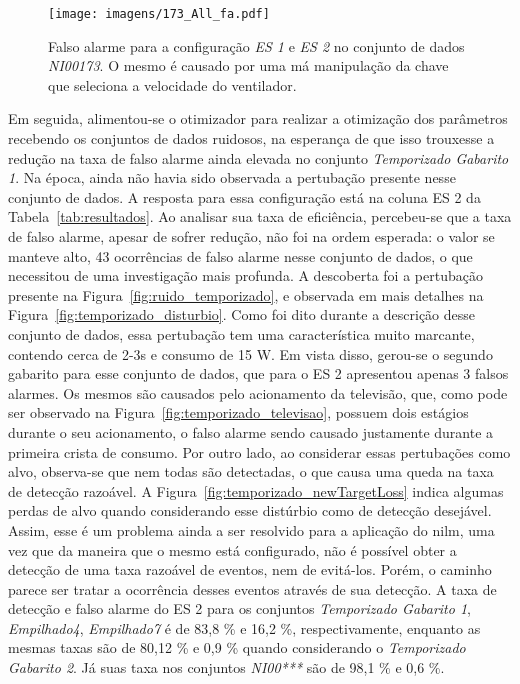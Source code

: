 \begin{sidewaysfigure}[p]
\centering
\texttt{[image: imagens/173\_All\_fa.pdf]}
\caption[Falso alarme para a configuração \emph{ES 1} e \emph{ES 2} no
conjunto de dados \emph{NI00173}.]{Falso alarme para a configuração
\emph{ES 1} e \emph{ES 2} no conjunto de dados \emph{NI00173}. O mesmo
é causado por uma má manipulação da chave que seleciona a
velocidade do ventilador.}
\label{fig:ni173_fa}
\end{sidewaysfigure}

Em seguida, alimentou-se o otimizador para realizar a otimização dos
parâmetros recebendo os conjuntos de dados ruidosos, na esperança de
que isso trouxesse a redução na taxa de falso alarme ainda elevada no
conjunto \emph{Temporizado Gabarito 1}. Na época, ainda não havia sido
observada a pertubação presente nesse conjunto de dados. A resposta
para essa configuração está na coluna ES 2 da
Tabela~\ref{tab:resultados}. Ao analisar sua taxa de eficiência,
percebeu-se que a taxa de falso alarme, apesar de sofrer redução, não
foi na ordem esperada: o valor se manteve alto, 43 ocorrências de
falso alarme nesse conjunto de dados, o que necessitou de uma
investigação mais profunda.  A descoberta foi a pertubação presente na
Figura~\ref{fig:ruido_temporizado}, e observada em mais detalhes na
Figura~\ref{fig:temporizado_disturbio}. Como foi dito durante a
descrição desse conjunto de dados, essa pertubação tem uma
característica muito marcante, contendo cerca de 2-3s e consumo de 15
W. Em vista disso, gerou-se o segundo gabarito para esse conjunto de
dados, que para o ES 2 apresentou apenas 3 falsos alarmes. Os mesmos
são causados pelo acionamento da televisão, que, como pode ser
observado na Figura~\ref{fig:temporizado_televisao}, possuem dois
estágios durante o seu acionamento, o falso alarme sendo causado
justamente durante a primeira crista de consumo. Por outro lado, ao
considerar essas pertubações como alvo, observa-se que nem todas são
detectadas, o que causa uma queda na taxa de detecção razoável. A
Figura~\ref{fig:temporizado_newTargetLoss} indica algumas perdas de
alvo quando considerando esse distúrbio como de detecção desejável.
Assim, esse é um problema ainda a ser resolvido para a aplicação do
\acs{nilm}, uma vez que da maneira que o mesmo está configurado, não é
possível obter a detecção de uma taxa razoável de eventos, nem de
evitá-los. Porém, o caminho parece ser tratar a ocorrência desses
eventos através de sua detecção. A taxa de detecção e falso alarme do
ES 2 para os conjuntos \emph{Temporizado Gabarito 1},
\emph{Empilhado4}, \emph{Empilhado7} é de 83,8 \% e 16,2 \%,
respectivamente, enquanto as mesmas taxas são de 80,12 \% e 0,9 \%
quando considerando o \emph{Temporizado Gabarito 2}. Já suas taxa
nos conjuntos \emph{NI00***} são de 98,1 \% e 0,6 \%.

